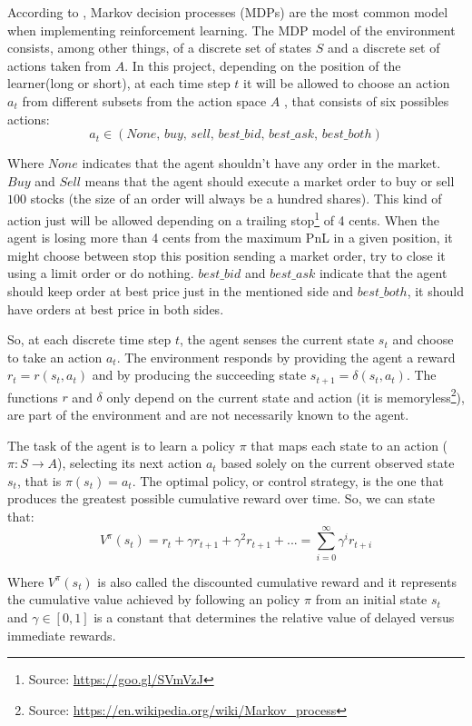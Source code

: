 \documentclass[a4paper]{article}
\begin{document}
According to \cite{chan2001electronic}, Markov decision processes (MDPs) are the most common model when implementing reinforcement learning.  The MDP model of the environment consists, among other things, of a discrete set of states $S$ and a discrete set of actions taken from $A$. In this project, depending on the position of the learner(long or short), at each time step $t$ it will be allowed to choose an action $a_t$ from different subsets from the action space $A$ , that consists of six possibles actions:
$$a_t \in \left (None,\, buy,\, sell,\, best\_bid,\, best\_ask,\, best\_both \right)$$

Where $None$ indicates that the agent shouldn't have any order in the market. $Buy$ and $Sell$ means that the agent should execute a market order to buy or sell $100$ stocks (the size of an order will always be a hundred shares). This kind of action just will be allowed depending on a trailing stop\footnote{Source: \url{https://goo.gl/SVmVzJ}} of 4 cents. When the agent is losing more than 4 cents from the maximum PnL in a given position, it might choose between stop this position sending a market order, try to close it using a limit order or do nothing. $best\_bid$ and $best\_ask$ indicate that the agent should keep order at best price just in the mentioned side and $best\_both$, it should have orders at best price in both sides.

So, at each discrete time step $t$, the agent senses the current state $s_t$ and choose to take an action $a_t$. The environment responds by providing the agent a reward $r_t=r(s_t, a_t)$ and by producing the succeeding state $s_{t+1}=\delta(s_t, a_t)$. The functions $r$ and $\delta$ only depend on the current state and action (it is memoryless\footnote{Source: \url{https://en.wikipedia.org/wiki/Markov_process}}), are part of the environment and are not necessarily known to the agent.

The task of the agent is to learn a policy $\pi$ that maps each state to an action ($\pi: S \rightarrow A$), selecting its next action $a_t$ based solely on the current observed state $s_t$, that is $\pi(s_t)=a_t$. The optimal policy, or control strategy, is the one that produces the greatest possible cumulative reward over time. So, we can state that:
$$V^{\pi}(s_t)= r_t + \gamma r_{t+1} + \gamma^2 r_{t+1} + ... = \sum_{i=0}^{\infty} \gamma^{i} r_{t+i}$$

Where $V^{\pi}(s_t)$ is also called the discounted cumulative reward and it represents the cumulative value achieved by following an policy $\pi$ from an initial state $s_t$ and $\gamma \in [0, 1]$ is a constant that determines the relative value of delayed versus immediate rewards.
\end{document}
